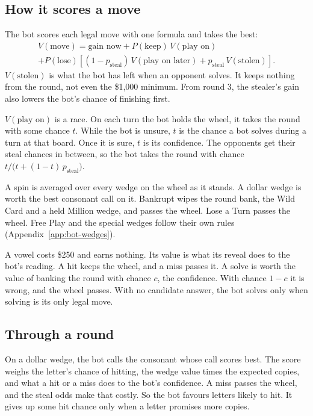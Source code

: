 \subsection{How it scores a move}

The bot scores each legal move with one formula and takes the best:
\begin{multline*}
  V(\text{move}) = \text{gain now} + P(\text{keep})\, V(\text{play on}) \\
  + P(\text{lose})\left[(1 - p_{\text{steal}})\, V(\text{play on later}) + p_{\text{steal}}\, V(\text{stolen})\right].
\end{multline*}
$V(\text{stolen})$ is what the bot has left when an opponent solves. It keeps nothing from the round, not even the \$1,000 minimum. From round 3, the stealer's gain also lowers the bot's chance of finishing first.

$V(\text{play on})$ is a race. On each turn the bot holds the wheel, it takes the round with some chance $t$. While the bot is unsure, $t$ is the chance a bot solves during a turn at that board. Once it is sure, $t$ is its confidence. The opponents get their steal chances in between, so the bot takes the round with chance $t / \big(t + (1 - t)\, p_{\text{steal}}\big)$.

A spin is averaged over every wedge on the wheel as it stands. A dollar wedge is worth the best consonant call on it. Bankrupt wipes the round bank, the Wild Card and a held Million wedge, and passes the wheel. Lose a Turn passes the wheel. Free Play and the special wedges follow their own rules (Appendix~\ref{app:bot-wedges}).

A vowel costs \$250 and earns nothing. Its value is what its reveal does to the bot's reading. A hit keeps the wheel, and a miss passes it. A solve is worth the value of banking the round with chance $c$, the confidence. With chance $1 - c$ it is wrong, and the wheel passes. With no candidate answer, the bot solves only when solving is its only legal move.

\subsection{Through a round}

On a dollar wedge, the bot calls the consonant whose call scores best. The score weighs the letter's chance of hitting, the wedge value times the expected copies, and what a hit or a miss does to the bot's confidence. A miss passes the wheel, and the steal odds make that costly. So the bot favours letters likely to hit. It gives up some hit chance only when a letter promises more copies.


